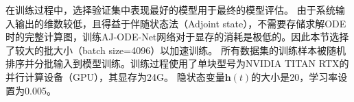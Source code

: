 在训练过程中，选择验证集中表现最好的模型用于最终的模型评估。
由于系统输入输出的维数较低，且得益于伴随状态法（Adjoint state），不需要存储求解ODE时的完整计算图，训练AJ-ODE-Net网络对于显存的消耗是极低的。因此本节选择了较大的批大小（batch size=4096）以加速训练。
所有数据集的训练样本被随机排序并分批输入到模型训练。训练过程使用了单块型号为NVIDIA TITAN RTX的并行计算设备（GPU），其显存为24G。
隐状态变量$\boldsymbol h(t)$的大小是20，学习率设置为0.005。


